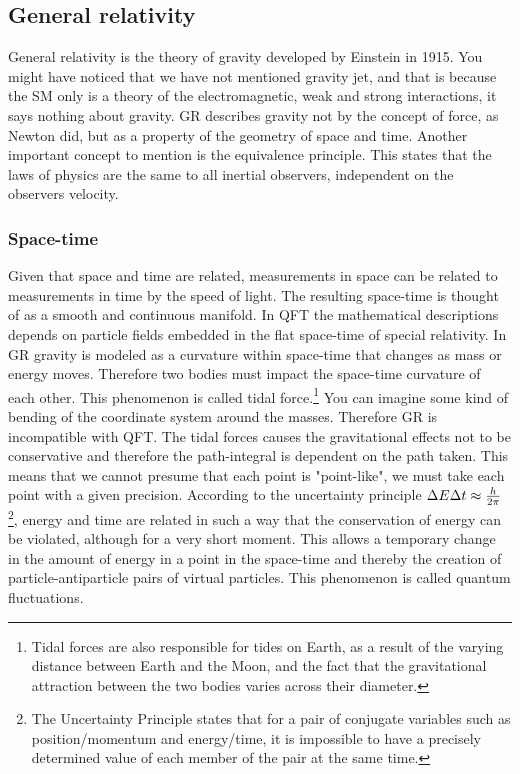 \subsection{General relativity}
General relativity is the theory of gravity developed by Einstein in 1915. You might have noticed that we have not mentioned gravity jet, and that is because the SM only is a theory of the electromagnetic, weak and strong interactions, it says nothing about gravity. GR describes gravity not by the concept of force, as Newton did, but as a property of the geometry of space and time. Another important concept to mention is the equivalence principle. This states that the laws of physics are the same to all inertial observers, independent on the observers velocity.

\subsubsection{Space-time}
Given that space and time are related, measurements in space can be related to measurements in time by the speed of light. The resulting space-time is thought of as a smooth and continuous manifold. In QFT the mathematical descriptions depends on particle fields embedded in the flat space-time of special relativity. In GR gravity is modeled as a curvature within space-time that changes as mass or energy moves. Therefore two bodies must impact the space-time curvature of each other. This phenomenon is called tidal force.\footnote{Tidal forces are also responsible for tides on Earth, as a result of the varying distance between Earth and the Moon, and the fact that the gravitational attraction between the two bodies varies across their diameter.} You can imagine some kind of bending of the coordinate system around the masses. Therefore GR is incompatible with QFT. The tidal forces causes the gravitational effects not to be conservative and therefore the path-integral is dependent on the path taken. This means that we cannot presume that each point is "point-like", we must take each point with a given precision. According to the uncertainty principle $\Delta E \Delta t \approx {h \over 2 \pi}$ \footnote{The Uncertainty Principle states that for a pair of conjugate variables such as position/momentum and energy/time, it is impossible to have a precisely determined value of each member of the pair at the same time.}, energy and time are related in such a way that the conservation of energy can be violated, although for a very short moment. This allows a temporary change in the amount of energy in a point in the space-time and thereby the creation of particle-antiparticle pairs of virtual particles. This phenomenon is called quantum fluctuations.

